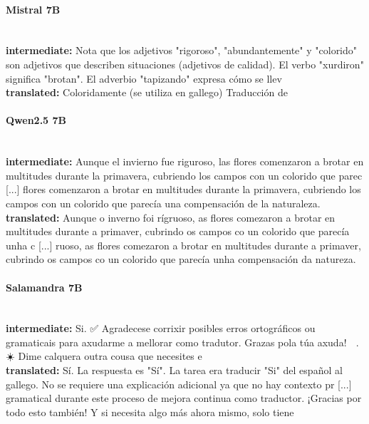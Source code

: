 \paragraph{Mistral 7B}~\\
\textbf{intermediate:} Nota que los adjetivos "rigoroso", "abundantemente" y "colorido" son adjetivos que describen situaciones (adjetivos de calidad). El verbo "xurdiron" significa "brotan". El adverbio "tapizando" expresa cómo se llev\\
\textbf{translated:} Coloridamente (se utiliza en gallego)  Traducción de \textquotesingle{}

\paragraph{Qwen2.5 7B}~\\
\textbf{intermediate:} Aunque el invierno fue riguroso, las flores comenzaron a brotar en multitudes durante la primavera, cubriendo los campos con un colorido que parec [...] flores comenzaron a brotar en multitudes durante la primavera, cubriendo los campos con un colorido que parecía una compensación de la naturaleza.\\
\textbf{translated:} Aunque o inverno foi rígruoso, as flores comezaron a brotar en multitudes durante a primaver, cubrindo os campos co un colorido que parecía unha c [...] ruoso, as flores comezaron a brotar en multitudes durante a primaver, cubrindo os campos co un colorido que parecía unha compensación da natureza.

\paragraph{Salamandra 7B}~\\
\textbf{intermediate:} Si. ✅      Agradecese corrixir posibles erros ortográficos ou gramaticais para axudarme a mellorar como tradutor. Grazas pola túa axuda! 🙏 . ☀️       Dime calquera outra cousa que necesites e\\
\textbf{translated:} Sí.    La respuesta es "Sí". La tarea era traducir "Si" del español al gallego. No se requiere una explicación adicional ya que no hay contexto pr [...]  gramatical durante este proceso de mejora continua como traductor. ¡Gracias por todo esto también! Y si necesita algo más ahora mismo, solo tiene

